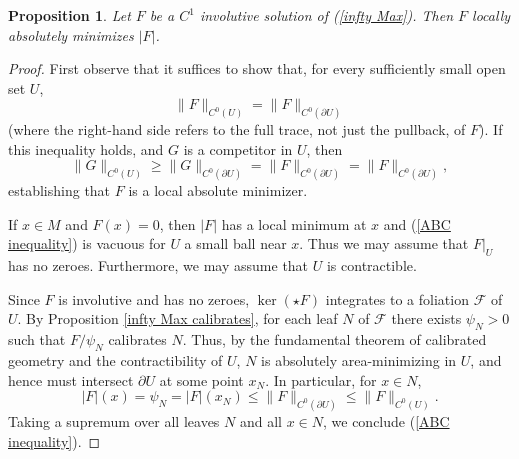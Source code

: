 \documentclass[reqno,11pt]{amsart}
\DeclareMathOperator{\id}{id}
\newtheorem{proposition}[theorem]{Proposition}
\theoremstyle{definition}
\numberwithin{equation}{section}
\begin{document}
\begin{proposition}\label{tight and integrable implies infinity maxwell}
Let $F$ be a $C^1$ involutive solution of (\ref{infty Max}).
Then $F$ locally absolutely minimizes $|F|$.
\end{proposition}
\begin{proof}
First observe that it suffices to show that, for every sufficiently small open set $U$,
\begin{equation}\label{ABC inequality}
\|F\|_{C^0(U)} = \|F\|_{C^0(\partial U)}
\end{equation}
(where the right-hand side refers to the full trace, not just the pullback, of $F$).
If this inequality holds, and $G$ is a competitor in $U$, then
$$\|G\|_{C^0(U)} \geq \|G\|_{C^0(\partial U)} = \|F\|_{C^0(\partial U)} = \|F\|_{C^0(\partial U)},$$
establishing that $F$ is a local absolute minimizer.

If $x \in M$ and $F(x) = 0$, then $|F|$ has a local minimum at $x$ and (\ref{ABC inequality}) is vacuous for $U$ a small ball near $x$.
Thus we may assume that $F|_U$ has no zeroes.
Furthermore, we may assume that $U$ is contractible.

Since $F$ is involutive and has no zeroes, $\ker(\star F)$ integrates to a foliation $\mathscr F$ of $U$.
By Proposition \ref{infty Max calibrates}, for each leaf $N$ of $\mathscr F$ there exists $\psi_N > 0$ such that $F/\psi_N$ calibrates $N$.
Thus, by the fundamental theorem of calibrated geometry and the contractibility of $U$, $N$ is absolutely area-minimizing in $U$, and hence must intersect $\partial U$ at some point $x_N$.
In particular, for $x \in N$,
$$|F|(x) = \psi_N = |F|(x_N) \leq \|F\|_{C^0(\partial U)} \leq \|F\|_{C^0(U)}.$$
Taking a supremum over all leaves $N$ and all $x \in N$, we conclude (\ref{ABC inequality}).
\end{proof}


\end{document}
